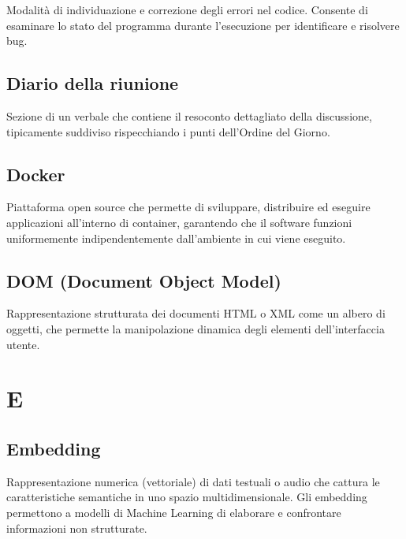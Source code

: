 \documentclass[a4paper, 11pt, oneside]{scrartcl} %
\begin{document}
Modalità di individuazione e correzione degli errori nel codice. Consente di esaminare lo stato del programma durante l'esecuzione per identificare e risolvere bug.

\vspace{0.5cm}

\subsection*{Diario della riunione}


Sezione di un verbale che contiene il resoconto dettagliato della discussione, tipicamente suddiviso rispecchiando i punti dell'Ordine del Giorno.

\vspace{0.5cm}

\subsection*{Docker}
Piattaforma open source che permette di sviluppare, distribuire ed eseguire applicazioni all'interno di container, garantendo che il software funzioni uniformemente indipendentemente dall'ambiente in cui viene eseguito.
\vspace{0.5cm}

\subsection*{DOM (Document Object Model)}
Rappresentazione strutturata dei documenti HTML o XML come un albero di oggetti, che permette la manipolazione dinamica degli elementi dell'interfaccia utente.
\vspace{0.5cm}


\section*{E}


\subsection*{Embedding}
Rappresentazione numerica (vettoriale) di dati testuali o audio che cattura le caratteristiche semantiche in uno spazio multidimensionale. Gli embedding permettono a modelli di Machine Learning di elaborare e confrontare informazioni non strutturate.
\vspace{0.5cm}
\end{document}
